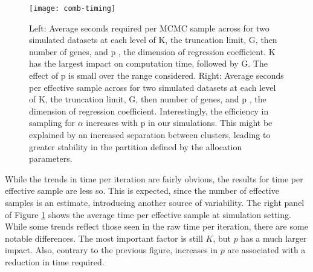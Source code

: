 {%

\begin{figure}[!h]
\centering
\texttt{[image: comb-timing]}
\caption[Average number of seconds per MCMC sample]{\small Left: Average seconds required per MCMC sample across for two simulated datasets at each level of K, the truncation limit, G, then number of genes, and p , the dimension of regression coefficient. K has the largest impact on computation time, followed by G. The effect of p is small over the range considered. Right: Average seconds per effective sample across for two simulated datasets at each level of K, the truncation limit, G, then number of genes, and p , the dimension of regression coefficient. Interestingly, the efficiency in sampling for $\alpha$ increases with p in our simulations. This might be explained by an increased separation between clusters, leading to greater stability in the partition defined by the allocation parameters.}%
\label{timing}
\end{figure}

While the trends in time per iteration are fairly obvious, the results for time per effective sample are less so. This is expected, since the number of effective samples is an estimate, introducing another source of variability. The right panel of Figure \ref{timing} shows the average time per effective sample at simulation setting. While some trends reflect those seen in the raw time per iteration, there are some notable differences. The most important factor is still $K$, but $p$ has a much larger impact. Also, contrary to the previous figure, increases in $p$ are associated with a reduction in time required.

}
